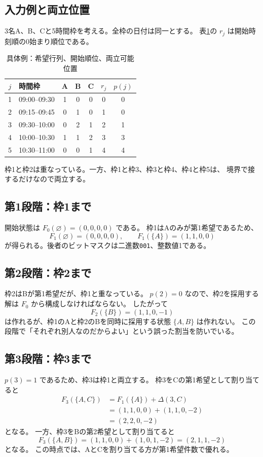 \documentclass[11pt,a4paper]{ltjsarticle}
\theoremstyle{definition}
\theoremstyle{remark}
\newcommand{\code}[1]{\texttt{#1}}
\begin{document}
\subsection{入力例と両立位置}
3名A、B、Cと5時間枠を考える。全枠の日付は同一とする。
表\ref{tab:worked}の $r_j$ は開始時刻順の0始まり順位である。
\begin{table}[htbp]
\centering\small
\caption{具体例：希望行列、開始順位、両立可能位置}
\label{tab:worked}
\begin{tabular}{c l ccc cc}
\toprule
$j$ & 時間枠 & A & B & C & $r_j$ & $p(j)$ \\
\midrule
1 & 09:00--09:30 & 1 & 0 & 0 & 0 & 0 \\
2 & 09:15--09:45 & 0 & 1 & 0 & 1 & 0 \\
3 & 09:30--10:00 & 0 & 2 & 1 & 2 & 1 \\
4 & 10:00--10:30 & 1 & 1 & 2 & 3 & 3 \\
5 & 10:30--11:00 & 0 & 0 & 1 & 4 & 4 \\
\bottomrule
\end{tabular}
\end{table}

枠1と枠2は重なっている。一方、枠1と枠3、枠3と枠4、枠4と枠5は、
境界で接するだけなので両立する。

\subsection{第1段階：枠1まで}
開始状態は $F_0(\varnothing)=(0,0,0,0)$ である。
枠1はAのみが第1希望であるため、
\[
 F_1(\varnothing)=(0,0,0,0),\qquad
 F_1(\{A\})=(1,1,0,0)
\]
が得られる。後者のビットマスクは二進数\code{001}、整数値1である。

\subsection{第2段階：枠2まで}
枠2はBが第1希望だが、枠1と重なっている。
$p(2)=0$ なので、枠2を採用する解は $F_0$ から構成しなければならない。
したがって
\[
 F_2(\{B\})=(1,1,0,-1)
\]
は作れるが、枠1のAと枠2のBを同時に採用する状態 $\{A,B\}$ は作れない。
この段階で「それぞれ別人なのだからよい」という誤った割当を防いでいる。

\subsection{第3段階：枠3まで}
$p(3)=1$ であるため、枠3は枠1と両立する。
枠3をCの第1希望として割り当てると
\begin{align*}
 F_3(\{A,C\})
 &=F_1(\{A\})+\Delta(3,C)\\
 &=(1,1,0,0)+(1,1,0,-2)\\
 &=(2,2,0,-2)
\end{align*}
となる。
一方、枠3をBの第2希望として割り当てると
\[
 F_3(\{A,B\})=(1,1,0,0)+(1,0,1,-2)=(2,1,1,-2)
\]
となる。
この時点では、AとCを割り当てる方が第1希望件数で優れる。
\end{document}
